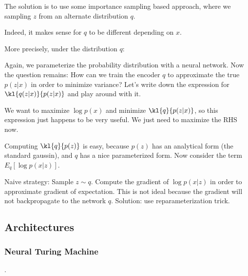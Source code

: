 \documentclass[12pt]{article}
\begin{document}
The solution is to use some importance sampling based approach, where we sampling $z$ from an alternate distribution $q$. 


Indeed, it makes sense for $q$ to be different depending on $x$. 


More precisely, under the distribution $q$:


Again, we parameterize the probability distribution with a neural network. Now the question remains: How can we train the encoder $q$ to approximate the true $p(z|x)$ in order to minimize variance? Let's write down the expression for $\kl{q(z|x)}{p(z|x)}$ and play around with it.


We want to maximize $\log p(x)$ and minimize $\kl{q}{p(z|x)}$, so this expression just happens to be very useful. We just need to maximize the RHS now.

Computing $\kl{q}{p(z)}$ is easy, because $p(z)$ has an analytical form (the standard gaussin), and $q$ has a nice parameterized form. Now consider the term $E_q[\log p(x|z)]$. 

Naive strategy: Sample $z \sim q$. Compute the gradient of $\log p(x|z)$ in order to approximate gradient of expectation. This is not ideal because the gradient will not backpropagate to the network $q$. Solution: use reparameterization trick.  

\subsection{Architectures}

\subsubsection{Neural Turing Machine}
.
\end{document}
